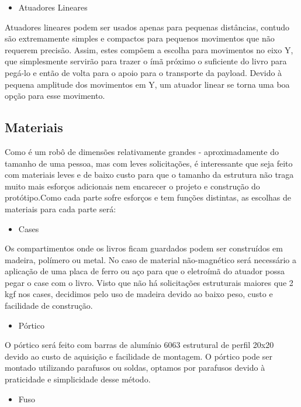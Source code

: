 \begin{itemize}
\item{Atuadores Lineares}
\end{itemize}

Atuadores lineares podem ser usados apenas para pequenas distâncias, contudo são extremamente simples e compactos para pequenos movimentos que não requerem precisão. Assim, estes compõem a escolha para movimentos no eixo Y, que simplesmente servirão para trazer o ímã próximo o suficiente do livro para pegá-lo e então de volta para o apoio para o transporte da payload. Devido à pequena amplitude dos movimentos em Y, um atuador linear se torna uma boa opção para esse movimento.

\subsection{Materiais}

Como é um robô de dimensões relativamente grandes - aproximadamente do tamanho de uma pessoa, mas com leves solicitações, é interessante que seja feito com materiais leves e de baixo custo para que o tamanho da estrutura não traga muito mais esforços adicionais nem encarecer o projeto e construção do protótipo.Como cada parte sofre esforços e tem funções distintas, as escolhas de materiais para cada parte será:

\begin{itemize}
\item{Cases}
\end{itemize}

Os compartimentos onde os livros ficam guardados podem ser construídos em madeira, polímero ou metal. No caso de material não-magnético será necessário a aplicação de uma placa de ferro ou aço para que o eletroímã do atuador possa pegar o case com o livro. Visto que não há solicitações estruturais maiores que 2 kgf nos cases, decidimos pelo uso de madeira devido ao baixo peso, custo e facilidade de construção.

\begin{itemize}
\item{Pórtico}
\end{itemize}

O pórtico será feito com barras de alumínio 6063 estrutural de perfil 20x20 devido ao custo de aquisição e facilidade de montagem. O pórtico pode ser montado utilizando parafusos ou soldas, optamos por parafusos devido à praticidade e simplicidade desse método.

\begin{itemize}
\item{Fuso}
\end{itemize}

